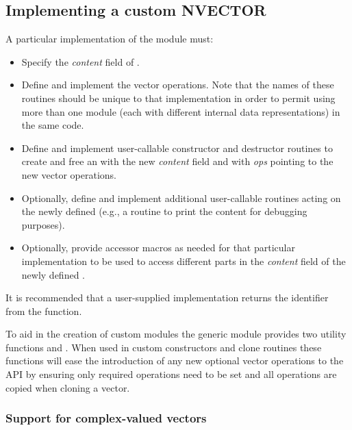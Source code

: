 \subsection{Implementing a custom NVECTOR}
\label{ss:nvector_custom_implmentation}

A particular implementation of the {\nvector} module must:

\begin{itemize}
\item Specify the {\em content} field of .
\item Define and implement the vector operations.
  Note that the names of these routines should be unique to that implementation in order
  to permit using more than one {\nvector} module (each with different 
  internal data representations) in the same code.
\item Define and implement user-callable constructor and destructor
  routines to create and free an  with
  the new {\em content} field and with {\em ops} pointing to the
  new vector operations.
\item Optionally, define and implement additional user-callable routines
  acting on the newly defined  (e.g., a routine to print
  the content for debugging purposes).
\item Optionally, provide accessor macros as needed for that particular implementation to
  be used to access different parts in the {\em content} field of the newly defined .
\end{itemize}

It is recommended that a user-supplied {\nvector} implementation returns the
 identifier from the  function.

To aid in the creation of custom {\nvector} modules the generic {\nvector}
module provides two utility functions  and .
When used in custom {\nvector} constructors and clone routines these functions
will ease the introduction of any new optional vector operations to the
{\nvector} API by ensuring only required operations need to be set and all
operations are copied when cloning a vector.


\subsubsection{Support for complex-valued vectors}


